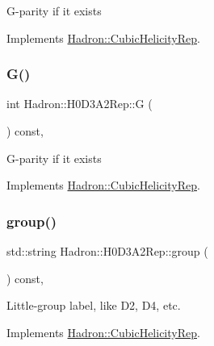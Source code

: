 G-\/parity if it exists 

Implements \mbox{\hyperlink{structHadron_1_1CubicHelicityRep_a50689f42be1e6170aa8cf6ad0597018b}{Hadron\+::\+Cubic\+Helicity\+Rep}}.

\mbox{\label{structHadron_1_1H0D3A2Rep_add1df3c4aec7ea1f7f37f8f3e9522cdd}} 
\subsubsection{\texorpdfstring{G()}{G()}\hspace{0.1cm}{\footnotesize\ttfamily [2/2]}}
{\footnotesize\ttfamily int Hadron\+::\+H0\+D3\+A2\+Rep\+::G (\begin{DoxyParamCaption}{ }\end{DoxyParamCaption}) const\hspace{0.3cm}{\ttfamily [inline]}, {\ttfamily [virtual]}}

G-\/parity if it exists 

Implements \mbox{\hyperlink{structHadron_1_1CubicHelicityRep_a50689f42be1e6170aa8cf6ad0597018b}{Hadron\+::\+Cubic\+Helicity\+Rep}}.

\mbox{\label{structHadron_1_1H0D3A2Rep_a456caa07466fd0a9ea5901d4aeb23e13}} 
\subsubsection{\texorpdfstring{group()}{group()}\hspace{0.1cm}{\footnotesize\ttfamily [1/3]}}
{\footnotesize\ttfamily std\+::string Hadron\+::\+H0\+D3\+A2\+Rep\+::group (\begin{DoxyParamCaption}{ }\end{DoxyParamCaption}) const\hspace{0.3cm}{\ttfamily [inline]}, {\ttfamily [virtual]}}

Little-\/group label, like D2, D4, etc. 

Implements \mbox{\hyperlink{structHadron_1_1CubicHelicityRep_a101a7d76cd8ccdad0f272db44b766113}{Hadron\+::\+Cubic\+Helicity\+Rep}}.

\mbox{\label{structHadron_1_1H0D3A2Rep_a456caa07466fd0a9ea5901d4aeb23e13}} 
